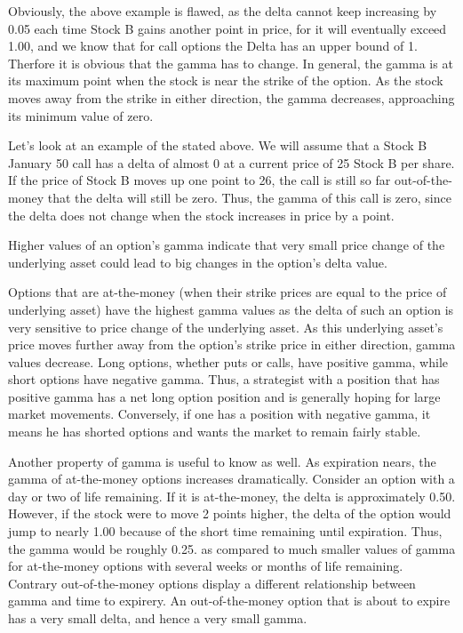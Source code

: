 \documentclass[a4paper, 12pt]{article}
\theoremstyle{definition}
\theoremstyle{plain}
\theoremstyle{definition}
\begin{document}
Obviously, the above example is flawed, as the
delta cannot keep increasing by 0.05 each time 
Stock B gains another point in price, for it will eventually exceed 1.00,
and we know that for call options the Delta has an upper bound of 1.
Therfore it is obvious that the gamma has to change.
In general, the gamma is at its maximum point when the stock is near the strike of the
option.
As the stock moves away from the strike in either direction, the gamma
decreases, approaching its minimum value of zero. 

Let's look at an example of the stated above. 
We will assume that a Stock B January 50 call has a 
delta of almost 0 at a current price of 25  Stock B per share.
If the price of Stock B moves up one point to 26, 
the call is still so far out-of-the-money that the delta
will still be zero.  Thus, the gamma of this call is zero, 
since the delta does not change when the stock increases in price by a point.

Higher values of an option's gamma indicate that very small 
price change of the underlying asset could lead to 
big changes in the option's delta value.

Options that are at-the-money (when their strike prices 
are equal to the price of underlying asset) have the 
highest gamma values as the delta of such an option is 
very sensitive to price change of the underlying asset. 
As this underlying asset's price moves further away 
from the option's strike price in either direction, 
gamma values decrease. 
Long options, whether puts or calls, have positive gamma, while short options
have negative gamma. Thus, a strategist with a position that has positive gamma has
a net long option position and is generally hoping for large market movements.
Conversely, if one has a position with negative gamma, it means he has shorted
options and wants the market to remain fairly stable. 
 
Another property of gamma is useful to know as well. 
As expiration nears, the gamma of at-the-money options increases dramatically.  
Consider an option with a day
or two of life remaining. If it is at-the-money, the delta is approximately 0.50.
However, if the stock were to move 2 points higher, the delta of the option would jump 
to nearly 1.00 because of the short time remaining until expiration. Thus, the gamma
would be roughly 0.25. as compared to much smaller values of gamma for at-the-money options with several
weeks or months of life remaining.
Contrary out-of-the-money options display a different relationship between gamma and
time to expirery. An out-of-the-money option that is about to expire has a very small
delta, and hence a very small gamma.
\end{document}
